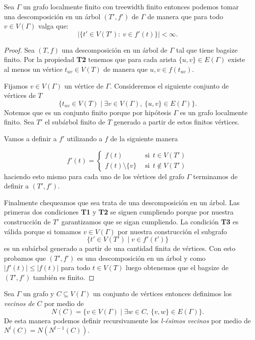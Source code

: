 \documentclass[tesis.tex]{subfiles}
\begin{document}
\begin{prop}\label{prop_tw_finitos_bolsones}
	Sea $\Gamma$ un grafo localmente finito con treewidth finito entonces podemos tomar una descomposición en un árbol $(T',f')$ de $\Gamma$ de manera que para todo $v \in V(\Gamma)$ valga que:
	\[
	| \{  t' \in V(T') : \ v \in f'(t)  \} | < \infty.
	\]
\end{prop}
\begin{proof}
	Sea $(T,f)$ una descomposición en un árbol de $\Gamma$ tal que tiene bagsize finito.
	Por la propiedad \textbf{T2} tenemos que para cada arista 
	$\{u,v\} \in E(\Gamma)$ existe al menos un vértice $t_{uv} \in V(T)$ de manera que $u,v \in f(t_{uv})$.
	
	Fijamos $v \in V(\Gamma)$ un vértice  de $\Gamma$.
	Consideremos el siguiente conjunto de vértices de $T$
	\[
		\{  t_{uv} \in V(T) \mid \exists v \in V(\Gamma), \ \{ u,v \} \in E(\Gamma)  \}.
	\]
	Notemos que es un conjunto finito porque por hipótesis $\Gamma$ es un grafo localmente finito.
	Sea $T'$ el subárbol finito de $T$ generado a partir de estos finitos vértices.
	
	Vamos a definir a $f'$ utilizando a $f$ de la siguiente manera
	
	\[
	f'(t) = 
	\begin{cases}
		f(t)  \ \  &\text{si} \ \  t \in V(T') \\
		f(t) \setminus \{  v \} \ \  &\text{si} \ \  t \notin V(T')
	\end{cases}
	\]
	haciendo esto mismo para cada uno de los vértices del grafo $\Gamma$ terminamos de definir a $(T',f')$.
	
	Finalmente chequeamos que sea trata de una descomposición en un árbol.
	Las primeras dos condiciones \textbf{T1} y \textbf{T2} se siguen cumpliendo porque por nuestra construcción de $T'$ garantizamos que se sigan cumpliendo.
	La condición \textbf{T3} es válida porque si tomamos $v \in V(\Gamma)$ por nuestra construcción el subgrafo 
	\[
		\{ t' \in V(T') \mid v \in f'(t') \}
	\]	
	es un subárbol generado a partir de una cantidad finita de vértices.
	Con esto probamos que $(T',f')$ es una descomposición en un árbol y como $|f'(t)| \le |f(t)|$ para todo $t \in V(T)$ luego obtenemos que el bagsize de $(T',f')$ también es finito.
\end{proof}

\begin{deff}
	Sea $\Gamma$ un grafo y $C \subseteq V(\Gamma)$ un conjunto de vértices entonces definimos los \emph{vecinos de $C$} por medio de 
	\[
	N(C) = \{ v \in V(\Gamma) \mid \exists w \in C, \ \{v,w \} \in E(\Gamma) \}.
	\]
	De esta manera podemos definir recursivamente los \emph{l-ésimos vecinos} por medio de $N^l(C) = N(N^{l-1}(C))$.
\end{deff}
\end{document}
